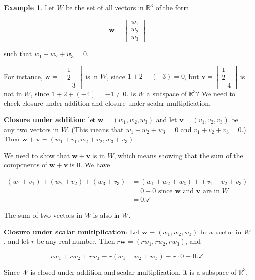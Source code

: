 \documentclass[
]{book}
\theoremstyle{definition}
\theoremstyle{definition}
\newtheorem{example}{Example}[chapter]
\theoremstyle{definition}
\theoremstyle{definition}
\theoremstyle{remark}
\begin{document}
\begin{examplebox}

\begin{example}
Let \(W\) be the set of all vectors in \(\mathbb{R}^3\) of the form

\[\mathbf{w}=\begin{bmatrix}w_1\\w_2\\w_3\end{bmatrix}\]

such that \(w_1+w_2+w_3=0\).

For instance, \(\mathbf{w}=\begin{bmatrix} 1\\2\\-3\end{bmatrix}\) is in \(W\), since \(1+2+(-3)=0\), but \(\mathbf{v}=\begin{bmatrix} 1\\2\\-4\end{bmatrix}\) is not in \(W\), since \(1+2+(-4)=-1\neq 0\). Is \(W\) a subspace of \(\mathbb{R}^3\)? We need to check closure under addition and closure under scalar multiplication.

\textbf{Closure under addition}: let \(\mathbf{w}=(w_1,w_2,w_3)\) and let \(\mathbf{v}=(v_1,v_2,v_3)\) be any two vectors in \(W\). (This means that \(w_1+w_2+w_3=0\) and \(v_1+v_2+v_3=0\).) Then \(\mathbf{w}+\mathbf{v}=(w_1+v_1,w_2+v_2,w_3+v_3)\).

We need to show that \(\mathbf{w}+\mathbf{v}\) is in \(W\), which means showing that the sum of the components of \(\mathbf{w}+\mathbf{v}\) is 0. We have

\begin{align*}
    (w_1+v_1)+(w_2+v_2)+(w_3+v_3)&=(w_1+w_2+w_3)+(v_1+v_2+v_3)\\
    &=0+0 \text{ since $\mathbf{w}$ and $\mathbf{v}$ are in $W$}\\
    &=0.\checkmark
\end{align*}

The sum of two vectors in \(W\) is also in \(W\).

\textbf{Closure under scalar multiplication}: Let \(\mathbf{w}=(w_1,w_2,w_3)\) be a vector in \(W\), and let \(r\) be any real number. Then \(r\mathbf{w}=(rw_1,rw_2,rw_3)\), and

\[rw_1+rw_2+rw_3=r(w_1+w_2+w_3)=r\cdot 0=0.\checkmark\]

Since \(W\) is closed under addition and scalar multiplication, it is a subspace of \(\mathbb{R}^3\).
\end{example}

\end{examplebox}
\end{document}
